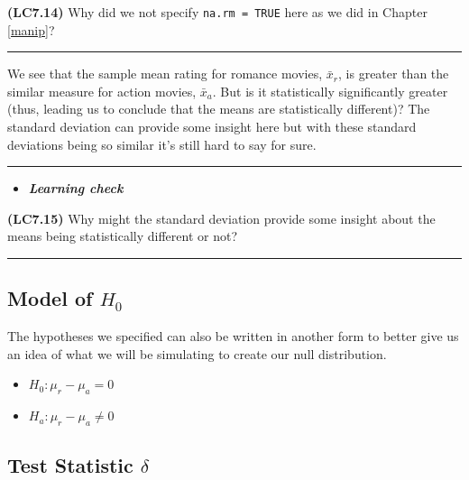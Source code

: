 \documentclass[]{tufte-book}
\let\oldrule=\rule
\renewcommand{\rule}[1]{\oldrule{\linewidth}}
\providecommand{\tightlist}{%
  \setlength{\itemsep}{0pt}\setlength{\parskip}{0pt}}
\newenvironment{rmdblock}[1]
  {\begin{shaded*}
  \begin{itemize}
  \renewcommand{\labelitemi}{
    \raisebox{-.7\height}[0pt][0pt]{
    }
  }
  \item
  }
  {
  \end{itemize}
  \end{shaded*}
  }
\newenvironment{learncheck}
  {\begin{rmdblock}{warning}}
  {\end{rmdblock}}
\theoremstyle{definition}
\theoremstyle{definition}
\theoremstyle{remark}
\begin{document}
\textbf{(LC7.14)} Why did we not specify \texttt{na.rm\ =\ TRUE} here as
we did in Chapter \ref{manip}?

\begin{center}\rule{0.5\linewidth}{\linethickness}\end{center}

We see that the sample mean rating for romance movies, \(\bar{x}_{r}\),
is greater than the similar measure for action movies, \(\bar{x}_a\).
But is it statistically significantly greater (thus, leading us to
conclude that the means are statistically different)? The standard
deviation can provide some insight here but with these standard
deviations being so similar it's still hard to say for sure.

\begin{center}\rule{0.5\linewidth}{\linethickness}\end{center}

\begin{learncheck}
\textbf{\emph{Learning check}}
\end{learncheck}

\textbf{(LC7.15)} Why might the standard deviation provide some insight
about the means being statistically different or not?

\begin{center}\rule{0.5\linewidth}{\linethickness}\end{center}

\subsection{\texorpdfstring{Model of
\(H_0\)}{Model of H\_0}}\label{model-of-h_0-1}

The hypotheses we specified can also be written in another form to
better give us an idea of what we will be simulating to create our null
distribution.

\begin{itemize}
\tightlist
\item
  \(H_0: \mu_r - \mu_a = 0\)
\item
  \(H_a: \mu_r - \mu_a \ne 0\)
\end{itemize}

\subsection{\texorpdfstring{Test Statistic
\(\delta\)}{Test Statistic \textbackslash{}delta}}\label{test-statistic-delta-1}
\end{document}
